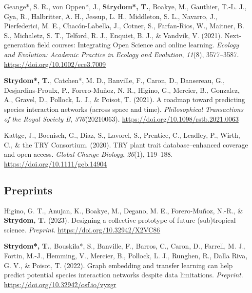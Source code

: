 \documentclass[11pt,a4paper,]{awesome-cv}
\newlength{\cslhangindent}
\newenvironment{CSLReferences}[2] %
 {%
  \setlength{\parindent}{0pt}
  \ifodd #1 \everypar{\setlength{\hangindent}{\cslhangindent}}\ignorespaces\fi
  \ifnum #2 > 0
  \setlength{\parskip}{#2\baselineskip}
  \fi
 }%
 {}
\begin{document}
\begin{CSLReferences}{1}{0}
\leavevmode{}%
Geange*, S. R., von Oppen*, J., \textbf{Strydom*, T.}, Boakye, M.,
Gauthier, T.-L. J., Gya, R., Halbritter, A. H., Jessup, L. H.,
Middleton, S. L., Navarro, J., Pierfederici, M. E., Chacón-Labella, J.,
Cotner, S., Farfan-Rios, W., Maitner, B. S., Michaletz, S. T., Telford,
R. J., Enquist, B. J., \& Vandvik, V. (2021). Next-generation field
courses: {Integrating Open Science} and online learning. \emph{Ecology
and Evolution: Academic Practice in Ecology and Evolution},
\emph{11}(8), 3577--3587. \url{https://doi.org/10.1002/ece3.7009}

\leavevmode{}%
\textbf{Strydom*, T.}, Catchen*, M. D., Banville, F., Caron, D.,
Dansereau, G., Desjardins-Proulx, P., Forero-Muñoz, N. R., Higino, G.,
Mercier, B., Gonzalez, A., Gravel, D., Pollock, L. J., \& Poisot, T.
(2021). A roadmap toward predicting species interaction networks (across
space and time). \emph{Philosophical Transactions of the Royal Society
B}, \emph{376}(20210063). \url{https://doi.org/10.1098/rstb.2021.0063}

\leavevmode{}%
Kattge, J., Boenisch, G., Diaz, S., Lavorel, S., Prentice, C., Leadley,
P., Wirth, C., \& the TRY Consortium. (2020). TRY plant trait
database--enhanced coverage and open access. \emph{Global Change
Biology}, \emph{26}(1), 119--188.
\url{https://doi.org/10.1111/gcb.14904}

\end{CSLReferences}

\vspace{\baselineskip}

\hypertarget{preprints}{%
\subsection{\texorpdfstring{\textbf{Preprints}}{Preprints}}\label{preprints}}

\hypertarget{refs-review}{}
\begin{CSLReferences}{1}{0}
\leavevmode{}%
Higino, G. T., Anujan, K., Boakye, M., Degano, M. E., Forero-Muñoz,
N.-R., \& \textbf{Strydom, T.} (2023). Designing a collective prototype
of future (sub)tropical science. \emph{Preprint}.
\url{https://doi.org/10.32942/X2VC86}

\leavevmode{}%
\textbf{Strydom*, T.}, Bouskila*, S., Banville, F., Barros, C., Caron,
D., Farrell, M. J., Fortin, M.-J., Hemming, V., Mercier, B., Pollock, L.
J., Runghen, R., Dalla Riva, G. V., \& Poisot, T. (2022). Graph
embedding and transfer learning can help predict potential species
interaction networks despite data limitations. \emph{Preprint}.
\url{https://doi.org/10.32942/osf.io/vyzgr}

\end{CSLReferences}
\end{document}
